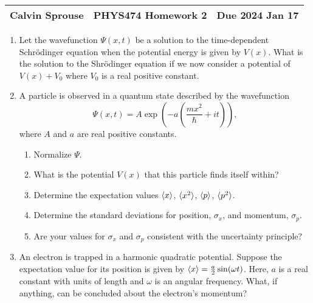 \documentclass[a4paper, 12pt]{config/homework}
\begin{document}
\noindent
\begin{tabularx}{\textwidth}{>{\centering\arraybackslash}X>{\centering\arraybackslash}X>{\centering\arraybackslash}X}
Calvin Sprouse & PHYS474 Homework 2 & Due 2024 Jan 17\\
\midrule
\end{tabularx}

\begin{enumerate}
\item Let the wavefunction \(\Psi(x,t)\) be a solution to the time-dependent Schr{\"o}dinger equation when the potential energy is given by \(V(x)\). What is the solution to the Shr{\"o}dinger equation if we now consider a potential of \(V(x) + V_0\) where \(V_0\) is a real positive constant.

\pagebreak
\item A particle is observed in a quantum state described by the wavefunction
\[\Psi(x,t) = A\exp\left(-a\left(\frac{mx^2}{\hbar}+it\right)\right),\]
where \(A\) and \(a\) are real positive constants.
\begin{enumerate}[label=(\alph*)]
\item Normalize \(\Psi \).
\item What is the potential \(V(x)\) that this particle finds itself within?
\item Determine the expectation values \(\braket{x}\), \(\braket{x^2}\), \(\braket{p}\), \(\braket{p^2}\).
\item Determine the standard deviations for position, \(\sigma_x\), and momentum, \(\sigma_p\).
\item Are your values for \(\sigma_x\) and \(\sigma_p\) consistent with the uncertainty principle?
\end{enumerate}

\pagebreak
\item An electron is trapped in a harmonic quadratic potential. Suppose the expectation value for its position is given by \(\braket{x} = \frac{a}{2}\sin(\omega t)\). Here, \(a\) is a real constant with units of length and \(\omega \) is an angular frequency. What, if anything, can be concluded about the electron's momentum?
\end{enumerate}
\end{document}
